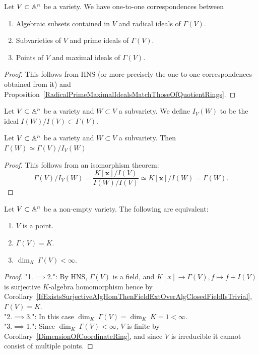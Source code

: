 \begin{proposition}\label{CorrespondenceOfDifferentTypesOfAlgebraicSetsWithDifferentTypesOfIdeals}
    Let $V\subset \mathbb{A}^n$ be a variety. We have one-to-one correspondences between  
    \begin{enumerate}
        \item Algebraic subsets contained in $V$ and radical ideals of $\Gamma(V)$.
        \item Subvarieties of $V$ and prime ideals of $\Gamma(V)$.
        \item Points of $V$ and maximal ideals of $\Gamma(V)$.
    \end{enumerate}
\end{proposition}
\begin{proof}
    This follows from HNS (or more precisely the one-to-one correspondences obtained from it) and Proposition~\ref{RadicalPrimeMaximalIdealsMatchThoseOfQuotientRings}.
\end{proof}
\begin{definition}\label{RestrictionOfPolynomialFunctions}
    Let $V\subset \mathbb{A}^n$ be a variety and $W\subset V$ a subvariety. We define $I_V(W)$ to be the ideal $I(W)/I(V)\subset \Gamma(V)$.
\end{definition}
\begin{lemma}
    Let $V\subset \mathbb{A}^n$ be a variety and $W\subset V$ a subvariety. Then $\Gamma(W)\simeq \Gamma(V)/I_V(W)$
\end{lemma}
\begin{proof}
    This follows from an isomorphism theorem:  
    $$\Gamma(V)/I_V(W) = \frac{K[\mathbf{x}]/I(V)}{I(W)/I(V)}\simeq K[\mathbf{x}]/I(W) = \Gamma(W).$$
\end{proof}
\begin{proposition}
    Let $V\subset \mathbb{A}^n$ be a non-empty variety. The following are equivalent:
    \begin{enumerate}
        \item $V$ is a point.
        \item $\Gamma(V)= K$.
        \item $\dim_K \ \Gamma(V) < \infty$.
    \end{enumerate}
\end{proposition}
\begin{proof}
    "1.$\implies$2.": By HNS, $\Gamma(V)$ is a field, and $K[x]\rightarrow \Gamma(V), f\mapsto f+I(V)$ is surjective $K$-algebra homomorphism hence by Corollary~\ref{IfExistsSurjectiveAlgHomThenFieldExtOverAlgClosedFieldIsTrivial}, $\Gamma(V) = K$.\\
    "2.$\implies$3.": In this case $\dim_K\ \Gamma(V) = \dim_K\ K = 1<\infty$.\\
    "3.$\implies$1.": Since $\dim_K\ \Gamma(V)<\infty$, $V$ is finite by Corollary~\ref{DimensionOfCoordinateRing}, and since $V$ is irreducible it cannot consist of multiple points.  
\end{proof}
